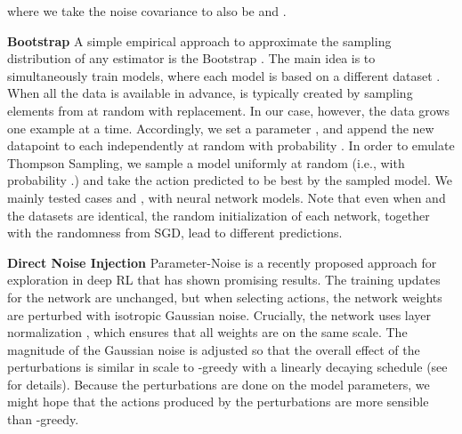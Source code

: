 \documentclass{article} \usepackage{iclr2018_conference,times}
\begin{document}
where we take the noise covariance  to also be  and .


\textbf{Bootstrap} A simple empirical approach to approximate the sampling distribution of any estimator is the Bootstrap \citep{efron1982jackknife}.
The main idea is to simultaneously train  models, where each model  is based on a different dataset .
When all the data  is available in advance,  is typically created by sampling  elements from  at random with replacement.
In our case, however, the data grows one example at a time.
Accordingly, we set a parameter , and append the new datapoint to each  independently at random with probability .
In order to emulate Thompson Sampling, we sample a model uniformly at random (i.e., with probability .) and take the action predicted to be best by the sampled model.
We mainly tested cases  and , with neural network models.
Note that even when  and the datasets are identical, the random initialization of each network, together with the randomness from SGD, lead to different predictions.


\textbf{Direct Noise Injection}
Parameter-Noise \citep{Plappert17} is a recently proposed approach for exploration in deep RL that has shown promising results. The training updates for the network are unchanged, but when selecting actions, the network weights  are perturbed with isotropic Gaussian noise. Crucially, the network uses layer normalization \citep{ba2016layer}, which ensures that all weights are on the same scale. The magnitude of the Gaussian noise is adjusted so that the overall effect of the perturbations is similar in scale to -greedy with a linearly decaying schedule (see \citep{Plappert17} for details). Because the perturbations are done on the model parameters, we might hope that the actions produced by the perturbations are more sensible than -greedy.
\end{document}
